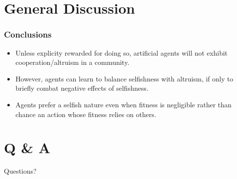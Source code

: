 \documentclass{beamer}
\begin{document}


  \section{General Discussion} %
  \label{sec:general_discussion}
  


  \begin{frame}[c]\frametitle{Conclusions}
    \begin{itemize}
      \item Unless explicity rewarded for doing so, artificial agents will not
            exhibit cooperation/altruism in a community.
      \item However, agents can learn to balance selfishness with
            altruism, if only to briefly combat negative effects of selfishness.
      \item Agents prefer a selfish nature even when fitness is negligible 
            rather than chance an action whose fitness relies on others.
      \end{itemize}
  \end{frame}
  \section{Q \& A} %
  \label{sec:q_and_a}
    \begin{frame}{Questions?}
      \titlepage
    \end{frame}
\end{document}
